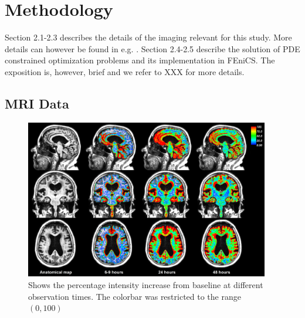 \documentclass[11pt,a4paper]{article}
\begin{document}
\section{Methodology}

Section 2.1-2.3 describes the details of the imaging relevant for this study. More details can however be
found in e.g. \cite{ringstad2018brain}. Section 2.4-2.5 describe the solution of PDE constrained optimization problems and
its implementation in FEniCS. The exposition is, however, brief and we refer to XXX for more details.     

\subsection{MRI Data}
\begin{figure}
\includegraphics[width=0.95\textwidth]{PatID-68-new-100.png} 
\caption{Shows the percentage intensity increase from baseline at different observation times. The colorbar was restricted to the range $(0,100)$ }
\label{fig1} 
\end{figure}
\end{document}
